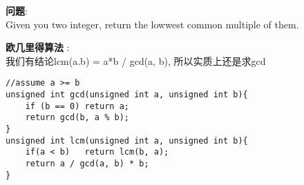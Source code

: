     
\begin{description}
    \item{\textbf{问题}}:\\
Given you two integer, return the lowwest common multiple of them.
    \item{\textbf{欧几里得算法}} : 
	\\我们有结论lcm(a.b) = a*b / gcd(a, b), 所以实质上还是求gcd
    \begin{lstlisting}
//assume a >= b
unsigned int gcd(unsigned int a, unsigned int b){
	if (b == 0) return a;
	return gcd(b, a % b);
}
unsigned int lcm(unsigned int a, unsigned int b){
	if(a < b)	return lcm(b, a);
	return a / gcd(a, b) * b;
}
    \end{lstlisting}
\end{description}
